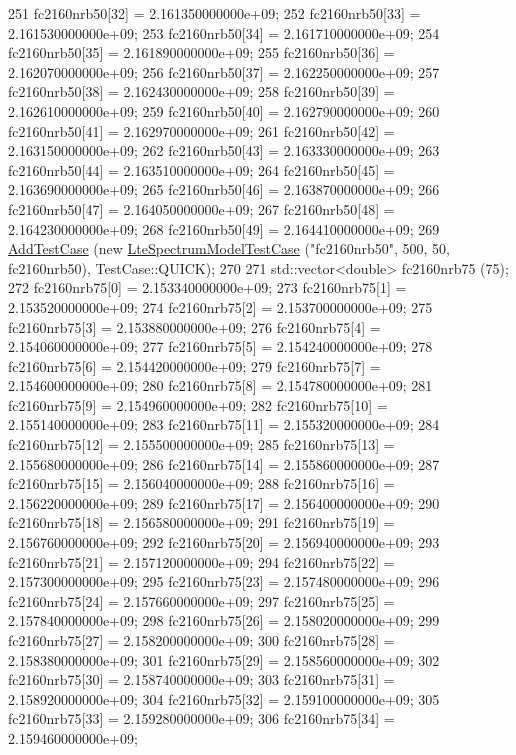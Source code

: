 \begin{DoxyCode}
251   fc2160nrb50[32] = 2.161350000000e+09;
252   fc2160nrb50[33] = 2.161530000000e+09;
253   fc2160nrb50[34] = 2.161710000000e+09;
254   fc2160nrb50[35] = 2.161890000000e+09;
255   fc2160nrb50[36] = 2.162070000000e+09;
256   fc2160nrb50[37] = 2.162250000000e+09;
257   fc2160nrb50[38] = 2.162430000000e+09;
258   fc2160nrb50[39] = 2.162610000000e+09;
259   fc2160nrb50[40] = 2.162790000000e+09;
260   fc2160nrb50[41] = 2.162970000000e+09;
261   fc2160nrb50[42] = 2.163150000000e+09;
262   fc2160nrb50[43] = 2.163330000000e+09;
263   fc2160nrb50[44] = 2.163510000000e+09;
264   fc2160nrb50[45] = 2.163690000000e+09;
265   fc2160nrb50[46] = 2.163870000000e+09;
266   fc2160nrb50[47] = 2.164050000000e+09;
267   fc2160nrb50[48] = 2.164230000000e+09;
268   fc2160nrb50[49] = 2.164410000000e+09;
269   \hyperlink{classns3_1_1TestCase_a3718088e3eefd5d6454569d2e0ddd835}{AddTestCase} (\textcolor{keyword}{new} \hyperlink{classLteSpectrumModelTestCase}{LteSpectrumModelTestCase} (\textcolor{stringliteral}{"fc2160nrb50"}, 500, 50, 
      fc2160nrb50), TestCase::QUICK);
270 
271   std::vector<double> fc2160nrb75 (75);
272   fc2160nrb75[0] = 2.153340000000e+09;
273   fc2160nrb75[1] = 2.153520000000e+09;
274   fc2160nrb75[2] = 2.153700000000e+09;
275   fc2160nrb75[3] = 2.153880000000e+09;
276   fc2160nrb75[4] = 2.154060000000e+09;
277   fc2160nrb75[5] = 2.154240000000e+09;
278   fc2160nrb75[6] = 2.154420000000e+09;
279   fc2160nrb75[7] = 2.154600000000e+09;
280   fc2160nrb75[8] = 2.154780000000e+09;
281   fc2160nrb75[9] = 2.154960000000e+09;
282   fc2160nrb75[10] = 2.155140000000e+09;
283   fc2160nrb75[11] = 2.155320000000e+09;
284   fc2160nrb75[12] = 2.155500000000e+09;
285   fc2160nrb75[13] = 2.155680000000e+09;
286   fc2160nrb75[14] = 2.155860000000e+09;
287   fc2160nrb75[15] = 2.156040000000e+09;
288   fc2160nrb75[16] = 2.156220000000e+09;
289   fc2160nrb75[17] = 2.156400000000e+09;
290   fc2160nrb75[18] = 2.156580000000e+09;
291   fc2160nrb75[19] = 2.156760000000e+09;
292   fc2160nrb75[20] = 2.156940000000e+09;
293   fc2160nrb75[21] = 2.157120000000e+09;
294   fc2160nrb75[22] = 2.157300000000e+09;
295   fc2160nrb75[23] = 2.157480000000e+09;
296   fc2160nrb75[24] = 2.157660000000e+09;
297   fc2160nrb75[25] = 2.157840000000e+09;
298   fc2160nrb75[26] = 2.158020000000e+09;
299   fc2160nrb75[27] = 2.158200000000e+09;
300   fc2160nrb75[28] = 2.158380000000e+09;
301   fc2160nrb75[29] = 2.158560000000e+09;
302   fc2160nrb75[30] = 2.158740000000e+09;
303   fc2160nrb75[31] = 2.158920000000e+09;
304   fc2160nrb75[32] = 2.159100000000e+09;
305   fc2160nrb75[33] = 2.159280000000e+09;
306   fc2160nrb75[34] = 2.159460000000e+09;

\end{DoxyCode}
